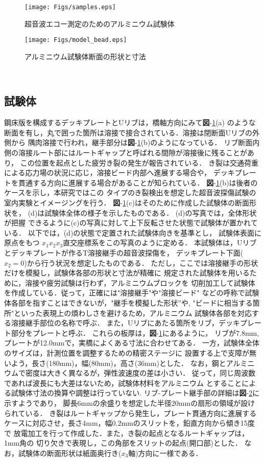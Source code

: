 \begin{figure}[thb]
\centering
	\texttt{[image: Figs/samples.eps]}
\caption{超音波エコー測定のためのアルミニウム試験体}
\label{fig:spec}
\end{figure}
\begin{figure}[htb]
\centering
	\texttt{[image: Figs/model\_bead.eps]}
	\caption{アルミニウム試験体断面の形状と寸法}
	\label{fig:model}
\end{figure}
﻿\subsection{試験体}
鋼床版を構成するデッキプレートとUリブは，橋軸方向にみて{\bf 図}-\ref{fig:spec}(a)
のような断面を有し，丸で囲った箇所は溶接で接合されている．溶接は閉断面Uリブの外側から
隅肉溶接で行われ，継手部分は{\bf 図}-\ref{fig:spec}(b)のようになっている．
リブ断面内側の溶接ルート部にはルートギャップと呼ばれる間隙が溶接後に残ることがあり，
この位置を起点とした疲労き裂の発生が報告されている\cite{Urib3}．
き裂は交通荷重による応力場の状況に応じ，溶接ビード内部へ進展する場合や，
デッキプレートを貫通する方向に進展する場合があることが知られている．
{\bf 図}-\ref{fig:spec}(b)は後者のケースを示し，本研究ではこの
タイプのき裂検出を想定した超音波探傷試験の室内実験とイメージングを行う．
{\bf 図}-\ref{fig:spec}(c)はそのために作成した試験体の断面形状を，
(d)は試験体全体の様子を示したものである． (d)の写真では，全体形状が把握
できるように(c)の写真に対して上下反転させた状態で試験体が置かれている．
以下では，(d)の状態で定置された試験体向きを基準とし， 試験体表面に原点をもつ
$x_1x_2x_3$直交座標系をこの写真のように定める． 
%
本試験体は，Uリブとデッキプレートが作るT溶接継手の超音波探傷を，
デッキプレート下面($x_2=0$)から行う状況を想定したものである．
ただし，ここでは溶接継手の形状だけを模擬し，試験体各部の形状と寸法が精確に
規定された試験体を用いるために，溶接や疲労試験は行わず，アルミニウムブロックを
切削加工して試験体を作成している．従って，正確には"溶接継手"や"溶接ビード"
などの呼称で試験体各部を指すことはできないが，"継手を模擬した形状”や,
"ビードに相当する箇所"といった表現上の煩わしさを避けるため，アルミニウム
試験体各部を対応する溶接継手部位の名称で呼ぶ．
また，Uリブにあたる箇所をリブ，デッキプレート部分をプレートと呼ぶ．
これらの板厚は，{\bf 図}-\ref{fig:spec}にあるように，
リブが7.8mm, プレートが12.0mmで，実橋によくある寸法に合わせてある．
一方，試験体全体のサイズは，計測位置を調整するための精密ステージに
設置する上で支障が無いよう，長さ(180mm)，幅(80mm)，高さ(36mm)とした．
なお，鋼とアルミニウムで密度は大きく異なるが，弾性波速度の差は小さい．
従って，同じ周波数であれば波長にも大差はないため，試験体材料をアルミニウム
とすることによる試験体寸法の換算や調整は行っていない.
リブ-プレート継手部の詳細は{\bf 図}-\ref{fig:model}に示すようであり，
脚長6mmの余盛りを想定した半径20mmの扇形の領域が設けられている．
き裂はルートギャップから発生し，プレート貫通方向に進展する
ケースに対応させ，長さ4mm，幅0.2mmのスリットを，鉛直方向から傾き15度で
放電加工を行って作成した．また，き裂の起点となるルートギャップは，1mm角の
切り欠きで表現し，この角部をスリットの起点(開口部)とした．
なお，試験体の断面形状は紙面奥行き($x_3$軸)方向に一様である．
